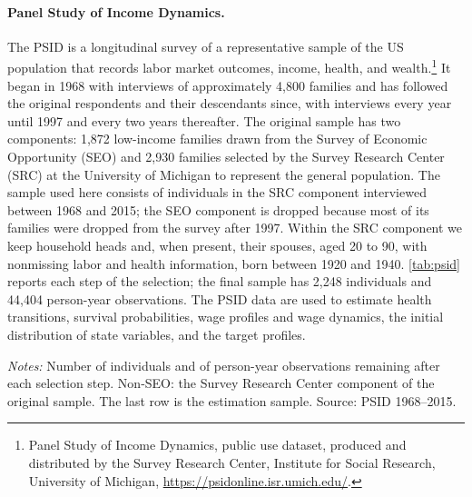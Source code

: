 \paragraph{Panel Study of Income Dynamics.}
The PSID is a longitudinal survey of a representative sample of the US population that records labor market outcomes, income, health, and wealth.\footnote{Panel Study of Income Dynamics, public use dataset, produced and distributed by the Survey Research Center, Institute for Social Research, University of Michigan, \url{https://psidonline.isr.umich.edu/}.} It began in 1968 with interviews of approximately 4,800 families and has followed the original respondents and their descendants since, with interviews every year until 1997 and every two years thereafter. %
The original sample has two components: 1,872 low-income families drawn from the Survey of Economic Opportunity (SEO) and 2,930 families selected by the Survey Research Center (SRC) at the University of Michigan to represent the general population. %
The sample used here consists of individuals in the SRC component interviewed between 1968 and 2015; the SEO component is dropped because most of its families were dropped from the survey after 1997. %
Within the SRC component we keep household heads and, when present, their spouses, aged 20 to 90, with nonmissing labor and health information, born between 1920 and 1940. %
\autoref{tab:psid} reports each step of the selection; the final sample has 2,248 individuals and 44,404 person-year observations. %
The PSID data are used to estimate health transitions, survival probabilities, wage profiles and wage dynamics, the initial distribution of state variables, and the target profiles. %

\begin{table}[!htbp]
\centering
\caption{PSID Sample Selection}
\label{tab:psid}
\vspace{6pt}
\footnotesize
\begin{threeparttable}

\begin{tablenotes}[flushleft]\scriptsize
\item[] \textit{Notes:} Number of individuals and of person-year observations remaining after each selection step. Non-SEO: the Survey Research Center component of the original sample. The last row is the estimation sample. Source: PSID 1968--2015.
\end{tablenotes}
\end{threeparttable}
\end{table}

